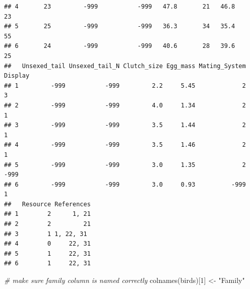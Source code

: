 \documentclass[
  12pt,
]{article}
\newenvironment{Shaded}{\begin{snugshade}}{\end{snugshade}}
\newcommand{\CommentTok}[1]{\textcolor[rgb]{0.56,0.35,0.01}{\textit{#1}}}
\newcommand{\DecValTok}[1]{\textcolor[rgb]{0.00,0.00,0.81}{#1}}
\newcommand{\FunctionTok}[1]{\textcolor[rgb]{0.00,0.00,0.00}{#1}}
\newcommand{\NormalTok}[1]{#1}
\newcommand{\OtherTok}[1]{\textcolor[rgb]{0.56,0.35,0.01}{#1}}
\newcommand{\StringTok}[1]{\textcolor[rgb]{0.31,0.60,0.02}{#1}}
\begin{document}
\begin{verbatim}
## 4       23         -999           -999   47.8       21   46.8       23
## 5       25         -999           -999   36.3       34   35.4       55
## 6       24         -999           -999   40.6       28   39.6       25
##   Unsexed_tail Unsexed_tail_N Clutch_size Egg_mass Mating_System Display
## 1         -999           -999         2.2     5.45             2       3
## 2         -999           -999         4.0     1.34             2       1
## 3         -999           -999         3.5     1.44             2       1
## 4         -999           -999         3.5     1.46             2       1
## 5         -999           -999         3.0     1.35             2    -999
## 6         -999           -999         3.0     0.93          -999       1
##   Resource References
## 1        2      1, 21
## 2        2         21
## 3        1 1, 22, 31 
## 4        0     22, 31
## 5        1     22, 31
## 6        1     22, 31
\end{verbatim}

\begin{Shaded}
\begin{Highlighting}[]
\CommentTok{\# make sure family column is named correctly}
\FunctionTok{colnames}\NormalTok{(birds)[}\DecValTok{1}\NormalTok{] }\OtherTok{\textless{}{-}} \StringTok{"Family"}
\end{Highlighting}
\end{Shaded}
\end{document}
